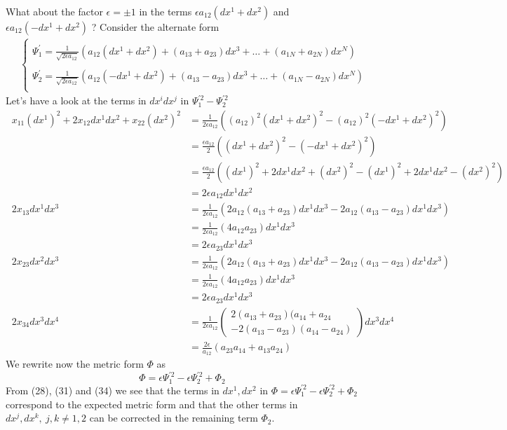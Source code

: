 What about the factor $\epsilon = \pm1$ in the terms $\epsilon a_{12}(dx^1+ dx^2)$ and $\epsilon a_{12}(-dx^1+ dx^2)$ ? Consider the alternate form
\begin{align}
\ &\left \{ \begin{array}{l} \\
\Psi^{'}_1 = \frac{1}{\sqrt{2 \epsilon a_{12}}}\left( a_{12}(dx^1+ dx^2) + (a_{13}+a_{23})dx^3+ \dots +(a_{1N}+a_{2N})dx^N \right) \\\\
\Psi^{'}_2 = \frac{1}{\sqrt{2 \epsilon a_{12}}}\left(  a_{12}(- dx^1+ dx^2) + (a_{13}-a_{23})dx^3+ \dots +(a_{1N}-a_{2N})dx^N \right) \\
\end{array}\right.
\end{align}
Let's have a look at the terms in $dx^idx^j$ in $\Psi_1^{'2}-\Psi^{'2}_2$\\
\begin{align}
\ x_{11}(dx^1)^2+ 2x_{12}dx^1dx^2+x_{22}(dx^2)^2&= \frac{1}{2 \epsilon a_{12}}\left(( a_{12})^2(dx^1 + dx^2)^2 - ( a_{12})^2(-dx^1 + dx^2)^2\right)  \\
&= \frac{\epsilon a_{12}}{2}\left((dx^1 +  dx^2)^2 - (- dx^1 + dx^2)^2\right)  \\
&= \frac{\epsilon a_{12}}{2}\left((dx^1)^2 + 2 dx^1dx^2+  (dx^2)^2 - (dx^1)^2 + 2 dx^1dx^2-  (dx^2)^2\right)  \\
&= 2 \epsilon a_{12}dx^1dx^2 \\
\ 2x_{13}dx^1dx^3&= \frac{1}{2 \epsilon a_{12}}(2 a_{12}(a_{13}+a_{23})dx^1dx^3 - 2a_{12}(a_{13}-a_{23})dx^1dx^3) \\
\ &= \frac{1}{2 \epsilon a_{12}}(4 a_{12}a_{23})dx^1dx^3 \\
 & =  2\epsilon a_{23}dx^1dx^3\\
 \ 2x_{23}dx^2dx^3&= \frac{1}{2 \epsilon a_{12}}(2 a_{12}(a_{13}+a_{23})dx^1dx^3 - 2 a_{12}(a_{13}-a_{23})dx^1dx^3) \\
\ &= \frac{1}{2 \epsilon a_{12}}(4 a_{12}a_{23})dx^1dx^3 \\
 & =  2\epsilon a_{23}dx^1dx^3\\
\ 2x_{34}dx^3dx^4&=  \frac{1}{2 \epsilon a_{12}}\left(\begin{array}{l} 2 (a_{13}+ a_{23})(a_{14}+ a_{24}\\ - 2 (a_{13}- a_{23})(a_{14}- a_{24}) \end{array} \right)dx^3dx^4 \\
\ &= \frac{2\epsilon}{ a_{12}}\left(a_{23}a_{14}+a_{13}a_{24}\right)
\end{align}
We rewrite now the metric form $\Phi$ as 
$$\Phi =\epsilon \Psi_1^{'2}- \epsilon \Psi^{'2}_2 + \Phi_2 $$
From (28), (31) and (34) we see that the terms in $dx^1, dx^2$ in $\Phi =\epsilon \Psi_1^{'2}- \epsilon \Psi^{'2}_2 + \Phi_2$ correspond to the expected  metric form and that the other terms in $dx^j, dx^k, \ j,k \neq 1,2$ can be corrected in the remaining term $\Phi_2$.
\newpage

